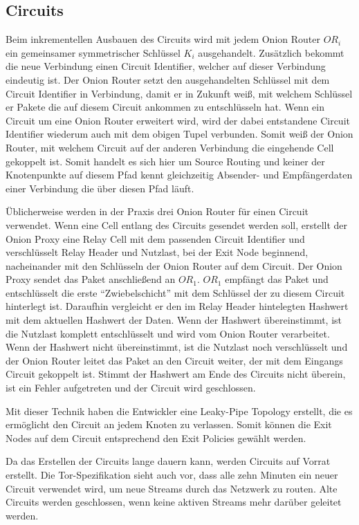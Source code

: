 \documentclass[fleqn,envcountsame,runningheads,10pt,a4paper]{llncs}
\begin{document}
\subsection{Circuits}

\newpage Beim inkrementellen Ausbauen des Circuits wird mit jedem Onion Router 
$\textit{OR}_i$ ein gemeinsamer symmetrischer Schlüssel $\textit{K}_i$ 
ausgehandelt. Zusätzlich bekommt die neue Verbindung einen Circuit Identifier, 
welcher auf dieser Verbindung eindeutig ist. Der Onion Router setzt den 
ausgehandelten Schlüssel mit dem Circuit Identifier in Verbindung, damit er in 
Zukunft weiß, mit welchem Schlüssel er Pakete die auf diesem Circuit ankommen zu 
entschlüsseln hat. Wenn ein Circuit um eine Onion Router erweitert wird, wird 
der dabei entstandene Circuit Identifier wiederum auch mit dem obigen Tupel 
verbunden. Somit weiß der Onion Router, mit welchem Circuit auf der anderen 
Verbindung die eingehende Cell gekoppelt ist. Somit handelt es sich hier um 
Source Routing und keiner der Knotenpunkte auf diesem Pfad kennt gleichzeitig 
Absender- und Empfängerdaten einer Verbindung die über diesen Pfad läuft. 

Üblicherweise werden in der Praxis drei Onion Router für einen Circuit 
verwendet. Wenn eine Cell entlang des Circuits gesendet werden soll, erstellt 
der Onion Proxy eine Relay Cell mit dem passenden Circuit Identifier und 
verschlüsselt Relay Header und Nutzlast, bei der Exit Node beginnend, 
nacheinander mit den Schlüsseln der Onion Router auf dem Circuit. Der Onion 
Proxy sendet das Paket anschließend an $\textit{OR}_1$. $\textit{OR}_1$ empfängt 
das Paket und entschlüsselt die erste ``Zwiebelschicht'' mit dem Schlüssel der 
zu diesem Circuit hinterlegt ist. Daraufhin vergleicht er den im Relay Header 
hintelegten Hashwert mit dem aktuellen Hashwert der Daten. Wenn der Hashwert 
übereinstimmt, ist die Nutzlast komplett entschlüsselt und wird vom Onion Router 
verarbeitet. Wenn der Hashwert nicht übereinstimmt, ist die Nutzlast noch 
verschlüsselt und der Onion Router leitet das Paket an den Circuit weiter, der 
mit dem Eingangs Circuit gekoppelt ist. Stimmt der Hashwert am Ende des Circuits 
nicht überein, ist ein Fehler aufgetreten und der Circuit wird geschlossen.

Mit dieser Technik haben die Entwickler eine Leaky-Pipe Topology erstellt, die 
es ermöglicht den Circuit an jedem Knoten zu verlassen. Somit können die Exit 
Nodes auf dem Circuit entsprechend den Exit Policies gewählt werden.

Da das Erstellen der Circuits lange dauern kann, werden Circuits auf Vorrat 
erstellt. Die Tor-Spezifikation sieht auch vor, dass alle zehn Minuten 
ein neuer Circuit verwendet wird, um neue Streams durch das Netzwerk zu routen. 
Alte Circuits werden geschlossen, wenn keine aktiven Streams mehr darüber 
geleitet werden.
\end{document}
